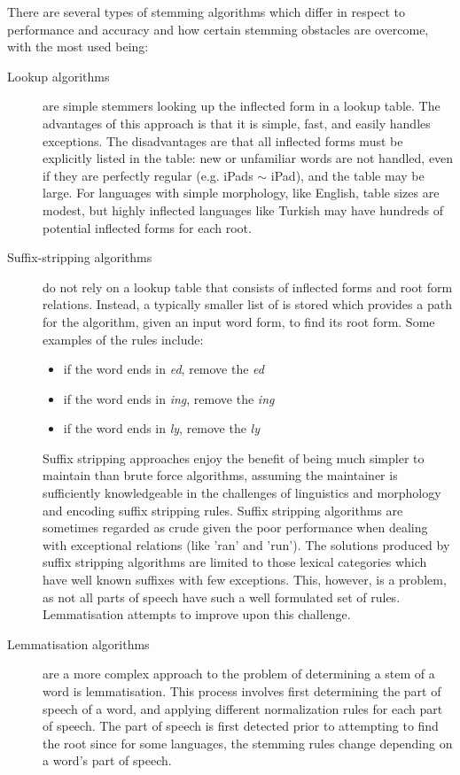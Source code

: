     There are several types of stemming algorithms which differ in respect to performance and accuracy and how certain stemming obstacles are overcome, with the most used being:
    \begin{description}
      \item[Lookup algorithms] are simple stemmers looking up the inflected form in a lookup table. The advantages of this approach is that it is simple, fast, and easily handles exceptions. The disadvantages are that all inflected forms must be explicitly listed in the table: new or unfamiliar words are not handled, even if they are perfectly regular (e.g. iPads $\sim$ iPad), and the table may be large. For languages with simple morphology, like English, table sizes are modest, but highly inflected languages like Turkish may have hundreds of potential inflected forms for each root.
      \item[Suffix-stripping algorithms] do not rely on a lookup table that consists of inflected forms and root form relations. Instead, a typically smaller list of  is stored which provides a path for the algorithm, given an input word form, to find its root form. Some examples of the rules include:
        \begin{itemize}
          \item if the word ends in \emph{ed}, remove the \emph{ed}
          \item if the word ends in \emph{ing}, remove the \emph{ing}
          \item if the word ends in \emph{ly}, remove the \emph{ly}
        \end{itemize}
        Suffix stripping approaches enjoy the benefit of being much simpler to maintain than brute force algorithms, assuming the maintainer is sufficiently knowledgeable in the challenges of linguistics and morphology and encoding suffix stripping rules. Suffix stripping algorithms are sometimes regarded as crude given the poor performance when dealing with exceptional relations (like 'ran' and 'run'). The solutions produced by suffix stripping algorithms are limited to those lexical categories which have well known suffixes with few exceptions. This, however, is a problem, as not all parts of speech have such a well formulated set of rules. Lemmatisation attempts to improve upon this challenge.       \item[Lemmatisation algorithms] are a more complex approach to the problem of determining a stem of a word is lemmatisation. This process involves first determining the part of speech of a word, and applying different normalization rules for each part of speech. The part of speech is first detected prior to attempting to find the root since for some languages, the stemming rules change depending on a word's part of speech.


\end{description}

